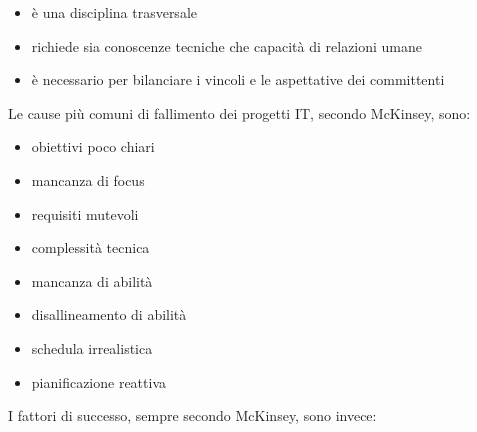 \documentclass[answers, a4paper, 11pt]{exam}
\begin{document}
\begin{itemize}
    \item è una disciplina trasversale
    \item richiede sia conoscenze tecniche che capacità di relazioni umane
    \item è necessario per bilanciare i vincoli e le aspettative dei committenti
\end{itemize}

Le cause più comuni di fallimento dei progetti IT, secondo McKinsey, sono:

\begin{itemize}
    \item obiettivi poco chiari
    \item mancanza di focus
    \item requisiti mutevoli
    \item complessità tecnica
    \item mancanza di abilità 
    \item disallineamento di abilità
    \item schedula irrealistica
    \item pianificazione reattiva
\end{itemize}

I fattori di successo, sempre secondo McKinsey, sono invece:
\end{document}

